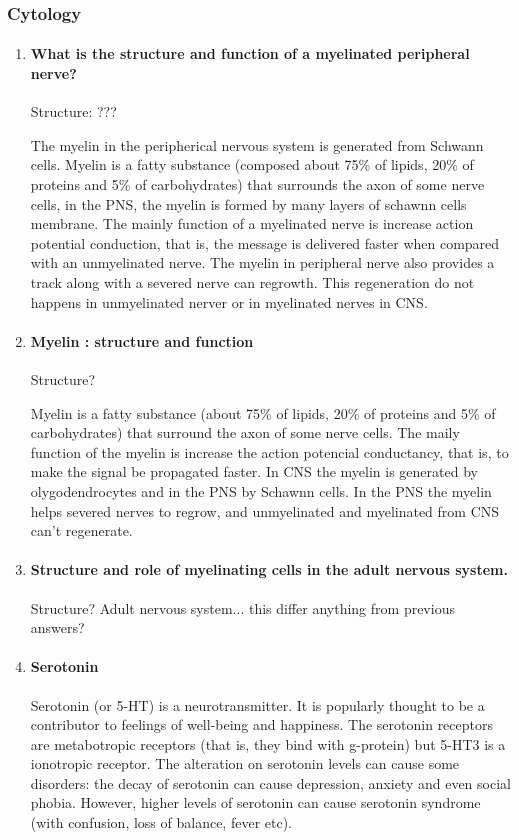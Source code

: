 \documentclass[12pt,article,oneside,a4paper]{memoir}
\begin{document}
\subsubsection{Cytology}
\begin{enumerate}
\item \paragraph{What is the structure and function of a myelinated peripheral nerve?}
Structure: ???

The myelin in the peripherical nervous system is generated from Schwann cells. Myelin is a fatty substance (composed about 75\% of lipids, 20\% of proteins and 5\% of carbohydrates) that surrounds the axon of some nerve cells, in the PNS, the myelin is formed by many layers of schawnn cells membrane. The mainly function of a myelinated nerve is increase action potential conduction, that is, the message is delivered faster when compared with an unmyelinated nerve. The myelin in peripheral nerve also provides a track along with a severed nerve can regrowth. This regeneration do not happens in unmyelinated nerver or in myelinated nerves in CNS.

\item \paragraph{Myelin : structure and function}
Structure?

Myelin is a fatty substance (about 75\% of lipids, 20\% of proteins and 5\% of carbohydrates) that surround the axon of some nerve cells.
The maily function of the myelin is increase the action potencial conductancy, that is, to make the signal be propagated faster. In CNS the myelin is generated by olygodendrocytes and in the PNS by Schawnn cells.
In the PNS the myelin helps severed nerves to regrow, and unmyelinated and myelinated from CNS can't regenerate.

\item \paragraph{Structure and role of myelinating cells in the adult nervous system.}
Structure?
Adult nervous system... this differ anything from previous answers?

\item \paragraph{Serotonin}
Serotonin (or 5-HT) is a neurotransmitter. It is popularly thought to be a contributor to feelings of well-being and happiness.
The serotonin receptors are metabotropic receptors (that is, they bind with g-protein) but 5-HT3 is a ionotropic receptor. The alteration on serotonin levels can cause some disorders: the decay of serotonin can cause depression, anxiety and even social phobia. However, higher levels of serotonin can cause serotonin syndrome (with confusion, loss of balance, fever etc).


\end{enumerate}
\end{document}
